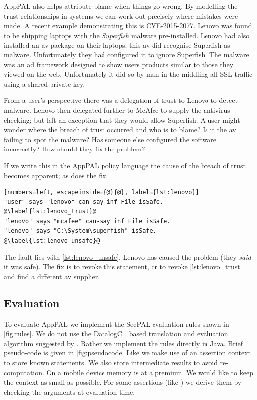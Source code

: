 \documentclass[]{scrartcl}
\begin{document}
AppPAL also helps attribute blame when things go wrong.
By modelling the trust relationships in systems we can work out precisely where mistakes were made.
A recent example demonstrating this is \textsc{CVE-2015-2077}.
Lenovo was found to be shipping laptops with the \emph{Superfish} malware pre-installed.
Lenovo had also installed an \ac{av} package on their laptops; this \ac{av} did recognise Superfish as malware.
Unfortunately they had configured it to ignore Superfish.
The malware was an ad framework designed to show users products similar to those they viewed on the web.
Unfortunately it did so by man-in-the-middling all SSL traffic using a shared private key.

From a user's perspective there was a delegation of trust to Lenovo to detect malware.
Lenovo then delegated further to McAfee to supply the antivirus checking; but left an exception that they would allow Superfish.
A user might wonder where the breach of trust occurred and who is to blame?
Is it the \ac{av} failing to spot the malware?
Has someone else configured the software incorrectly?
How should they fix the problem?

If we write this in the AppPAL policy language the cause of the breach of trust becomes apparent; as does the fix.
\begin{lstlisting}[numbers=left, escapeinside={@}{@}, label={lst:lenovo}]
"user" says "lenovo" can-say inf File isSafe. @\label{lst:lenovo_trust}@
"lenovo" says "mcafee" can-say inf File isSafe.
"lenovo" says "C:\System\superfish" isSafe. @\label{lst:lenovo_unsafe}@
\end{lstlisting}
The fault lies with \autoref{lst:lenovo_unsafe}.
Lenovo has caused the problem (they \emph{said} it was safe).
The fix is to revoke this statement, or to revoke \autoref{lst:lenovo_trust} and find a different \ac{av} supplier.

\subsection{Evaluation}
\label{ssec:eval}

To evaluate AppPAL we implement the SecPAL evaluation rules shown in \autoref{fig:rules}.
We do not use the DatalogC~\citep{Li:2003ix}~based translation and evaluation algorithm suggested by \citeauthor{Becker:2006vh}.
Rather we implement the rules directly in Java.
Brief pseudo-code is given in \autoref{fig:pseudocode}
Like \citeauthor{Becker:2006vh} we make use of an assertion context to store known statements.
We also store intermediate results to avoid re-computation.
On a mobile device memory is at a premium.
We would like to keep the context as small as possible.
For some assertions (like ) we derive them by checking the arguments at evaluation time.
\end{document}
